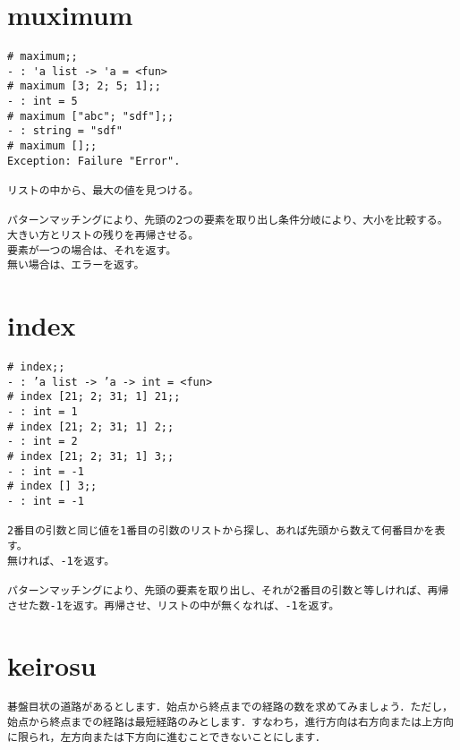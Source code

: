 \documentclass{jarticle}
\begin{document}
\newpage
\section{muximum}
\begin{verbatim}
# maximum;; 
- : 'a list -> 'a = <fun> 
# maximum [3; 2; 5; 1];; 
- : int = 5 
# maximum ["abc"; "sdf"];; 
- : string = "sdf" 
# maximum [];; 
Exception: Failure "Error".

リストの中から、最大の値を見つける。

パターンマッチングにより、先頭の2つの要素を取り出し条件分岐により、大小を比較する。
大きい方とリストの残りを再帰させる。
要素が一つの場合は、それを返す。
無い場合は、エラーを返す。
\end{verbatim}

\newpage
\section{index}
\begin{verbatim}
# index;;    
- : ’a list -> ’a -> int = <fun> 
# index [21; 2; 31; 1] 21;;    
- : int = 1    
# index [21; 2; 31; 1] 2;;    
- : int = 2    
# index [21; 2; 31; 1] 3;;    
- : int = -1    
# index [] 3;;    
- : int = -1

2番目の引数と同じ値を1番目の引数のリストから探し、あれば先頭から数えて何番目かを表す。
無ければ、-1を返す。

パターンマッチングにより、先頭の要素を取り出し、それが2番目の引数と等しければ、再帰させた数-1を返す。再帰させ、リストの中が無くなれば、-1を返す。
\end{verbatim}

\section{keirosu}
\begin{verbatim}
碁盤目状の道路があるとします．始点から終点までの経路の数を求めてみましょう．ただし，始点から終点までの経路は最短経路のみとします．すなわち，進行方向は右方向または上方向に限られ，左方向または下方向に進むことできないことにします．

\end{verbatim}
\end{document}
